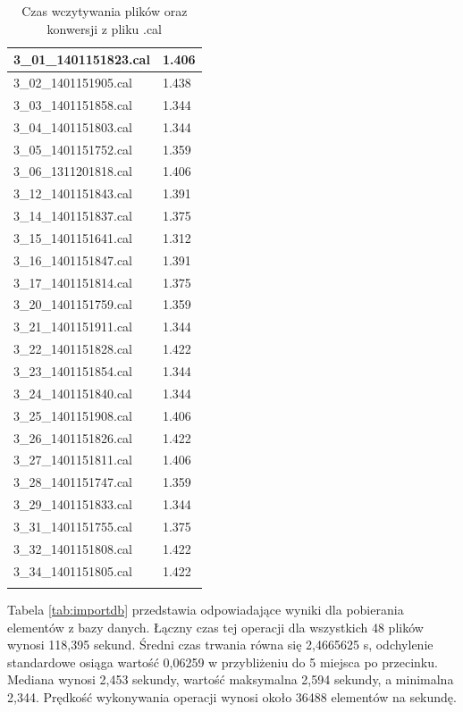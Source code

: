 \begin{longtable}{|l|l|}
    3\_01\_1401151823.cal & 1.406 \\ \hline
    3\_02\_1401151905.cal & 1.438 \\ \hline
    3\_03\_1401151858.cal & 1.344 \\ \hline
    3\_04\_1401151803.cal & 1.344 \\ \hline
    3\_05\_1401151752.cal & 1.359 \\ \hline
    3\_06\_1311201818.cal & 1.406 \\ \hline
    3\_12\_1401151843.cal & 1.391 \\ \hline
    3\_14\_1401151837.cal & 1.375 \\ \hline
    3\_15\_1401151641.cal & 1.312 \\ \hline
    3\_16\_1401151847.cal & 1.391 \\ \hline
    3\_17\_1401151814.cal & 1.375 \\ \hline
    3\_20\_1401151759.cal & 1.359 \\ \hline
    3\_21\_1401151911.cal & 1.344 \\ \hline
    3\_22\_1401151828.cal & 1.422 \\ \hline
    3\_23\_1401151854.cal & 1.344 \\ \hline
    3\_24\_1401151840.cal & 1.344 \\ \hline
    3\_25\_1401151908.cal & 1.406 \\ \hline
    3\_26\_1401151826.cal & 1.422 \\ \hline
    3\_27\_1401151811.cal & 1.406 \\ \hline
    3\_28\_1401151747.cal & 1.359 \\ \hline
    3\_29\_1401151833.cal & 1.344 \\ \hline
    3\_31\_1401151755.cal & 1.375 \\ \hline
    3\_32\_1401151808.cal & 1.422 \\ \hline
    3\_34\_1401151805.cal & 1.422 \\ \hline
    \caption{Czas wczytywania plików oraz konwersji z pliku .cal}
    \label{tab:fileimport}
\end{longtable}
Tabela \ref{tab:importdb} przedstawia odpowiadające wyniki dla pobierania elementów z bazy danych. Łączny czas tej operacji dla wszystkich 48 plików wynosi 118,395 sekund. Średni czas trwania równa się 2,4665625 s, odchylenie standardowe osiąga wartość 0,06259 w przybliżeniu do 5 miejsca po przecinku. Mediana wynosi 2,453 sekundy, wartość maksymalna 2,594 sekundy, a minimalna 2,344. Prędkość wykonywania operacji wynosi około 36488 elementów na sekundę.
